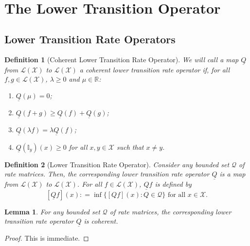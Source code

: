 \documentclass[10pt]{paper}
\newtheorem{lemma}[theorem]{Lemma}
\newtheorem{definition}{Definition}
\newcommand{\reals}{\mathbb{R}}
\newcommand{\states}{\mathcal{X}}
\newcommand{\gambles}{\mathcal{L}}
\newcommand{\gamblesX}{\gambles(\states)}
\newcommand{\ind}[1]{\mathbb{I}_{#1}}
\newcommand{\rateset}{\mathcal{Q}}
\newcommand{\lrate}{\underline{Q}}
\newcommand{\coloneqq}{:\!=}
\begin{document}
\section{The Lower Transition Operator}\label{sec:lower_operator}

\subsection{Lower Transition Rate Operators}

\begin{definition}[Coherent Lower Transition Rate Operator]\label{def:coh_low_trans_rate}
We will call a map $\lrate$ from $\gamblesX$ to $\gamblesX$ a \emph{coherent} lower transition rate operator if, for all $f,g\in\gamblesX$, $\lambda\geq0$ and $\mu\in\reals$:

\vspace{5pt}
\begin{enumerate}[label=LR\arabic*:]
\item
$\lrate(\mu)=0$;
\item
$\lrate(f+g)\geq\lrate(f)+\lrate(g)$;
\item
$\lrate(\lambda f)=\lambda\lrate(f)$;
\item
$\lrate(\ind{y})(x)\geq0$ for all $x,y\in\states$ such that $x\neq y$.
\end{enumerate}
\vspace{5pt}
\end{definition}

\begin{definition}[Lower Transition Rate Operator]\label{def:low_trans_rate}
Consider any bounded set $\rateset$ of rate matrices. Then, the corresponding \emph{lower transition rate operator} $\lrate$ is a map from $\gamblesX$ to $\gamblesX$. For all $f\in\gamblesX$, $\lrate f$ is defined by
\begin{equation}\label{eq:deflowerbound}
\left[\lrate f\right](x)\coloneqq\inf\bigl\{\left[Qf\right](x)\colon Q\in\rateset\bigr\}\text{ for all $x\in\states$}.
\end{equation}
\end{definition}

\begin{lemma}\label{lemma:lrateiscoherent}
For any bounded set $\rateset$ of rate matrices, the corresponding lower transition rate operator $\lrate$ is coherent.
\end{lemma}
\begin{proof}
This is immediate.
\end{proof}
\end{document}
